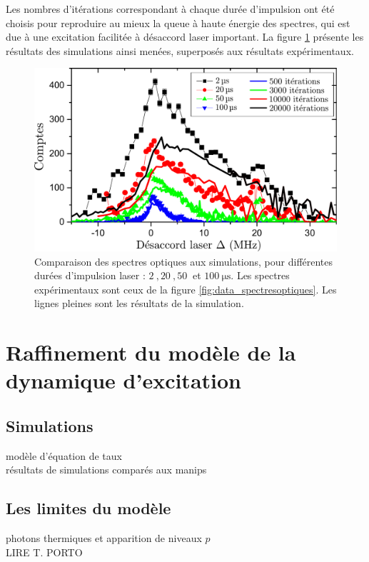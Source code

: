 Les nombres d'itérations correspondant à chaque durée d'impulsion ont été choisis pour reproduire au mieux la queue à haute énergie des spectres, qui est due à une excitation facilitée à désaccord laser important.
La figure \ref{fig:opt_spectra_firstTest} présente les résultats des simulations ainsi menées, superposés aux résultats expérimentaux.
%
\begin{figure}[!h]
\centering
\includegraphics[width=\linewidth]{figures/low_l/raies_laser_vieilles_simus}
\caption[Comparaison des spectres optiques au premier modèle de simulation]{
Comparaison des spectres optiques aux simulations, pour différentes durées d'impulsion laser : $\SI{2}{},\SI{20}{},\SI{50}{}$ et $\SI{100}{\us}$.
Les spectres expérimentaux sont ceux de la figure \ref{fig:data_spectresoptiques}.
Les lignes pleines sont les résultats de la simulation.
}
\label{fig:opt_spectra_firstTest}
\end{figure}
%


\section{Raffinement du modèle de la dynamique d'excitation}
	\subsection{Simulations}
		\noindent modèle d'équation de taux\\
		\noindent résultats de simulations comparés aux manips\\
	\subsection{Les limites du modèle}
		\noindent photons thermiques et apparition de niveaux $p$ \\
		LIRE T. PORTO
		
